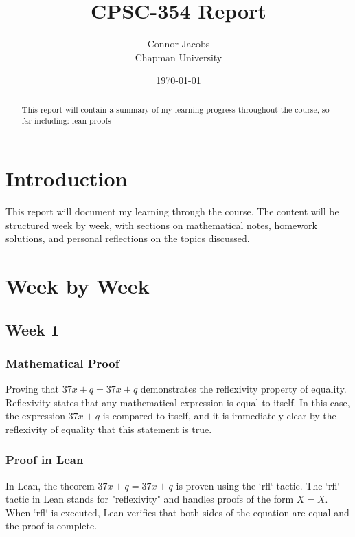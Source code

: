 \documentclass{article}
\title{CPSC-354 Report}
\author{Connor Jacobs \\ Chapman University}
\date{\today}
\theoremstyle{theorem}
\theoremstyle{definition}
\theoremstyle{remark}
\begin{document}
\maketitle

\begin{abstract}
This report will contain a summary of my learning progress throughout the course, so far including: lean proofs
\end{abstract}

\setcounter{tocdepth}{3}
\tableofcontents

\section{Introduction}\label{intro}

This report will document my learning through the course. The content will be structured week by week, with sections on mathematical notes, homework solutions, and personal reflections on the topics discussed.

\section{Week by Week}\label{homework}

\subsection{Week 1}

\subsubsection*{Mathematical Proof}

Proving that $37x + q = 37x + q$ demonstrates the reflexivity property of equality. Reflexivity states that any mathematical expression is equal to itself. In this case, the expression $37x + q$ is compared to itself, and it is immediately clear by the reflexivity of equality that this statement is true.

\subsubsection*{Proof in Lean}

In Lean, the theorem $37x + q = 37x + q$ is proven using the `rfl` tactic. The `rfl` tactic in Lean stands for "reflexivity" and handles proofs of the form $X = X$. When `rfl` is executed, Lean verifies that both sides of the equation are equal and the proof is complete.
\end{document}
